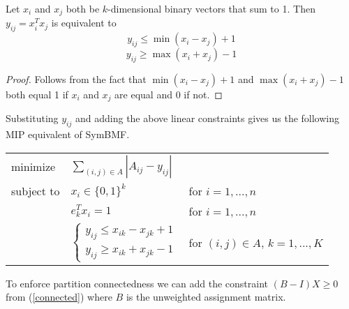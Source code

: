 \begin{lemma}
Let $x_i$ and $x_j$ both be $k$-dimensional binary vectors that sum to
1. Then $y_{ij} = x_i^T x_j$ is equivalent to
\[ y_{ij} \leq \min (x_i - x_j) + 1 \]
\[ y_{ij} \geq \max (x_i + x_j) - 1 \]

\end{lemma}

\begin{proof}
Follows from the fact that $\min (x_i - x_j) + 1$ and
$\max (x_i + x_j) - 1$ both equal 1 if $x_i$ and $x_j$ are equal
and 0 if not.
\end{proof}

Substituting $y_{ij}$ and adding the above linear constraints gives us
the following MIP equivalent of SymBMF.

\begin{center}
\begin{tabular}{l l l}
minimize   & $\sum_{(i,j) \in A} |A_{ij} - y_{ij}|$ \\
subject to & $x_i \in \{0, 1\}^k$ & for $i = 1, ..., n$ \\
           & $e_k^T x_i = 1$ & for $i = 1, ..., n$ \\
           & $\begin{cases}
             y_{ij} \leq x_{ik} - x_{jk} + 1 \\
             y_{ij} \geq x_{ik} + x_{jk} - 1
             \end{cases}$
           & for $(i,j) \in A$, $k = 1, ..., K$
\end{tabular}
\end{center}

To enforce partition connectedness we can add the constraint
$(B - I) X \geq 0$ from (\ref{connected}) where $B$ is the unweighted
assignment matrix.
